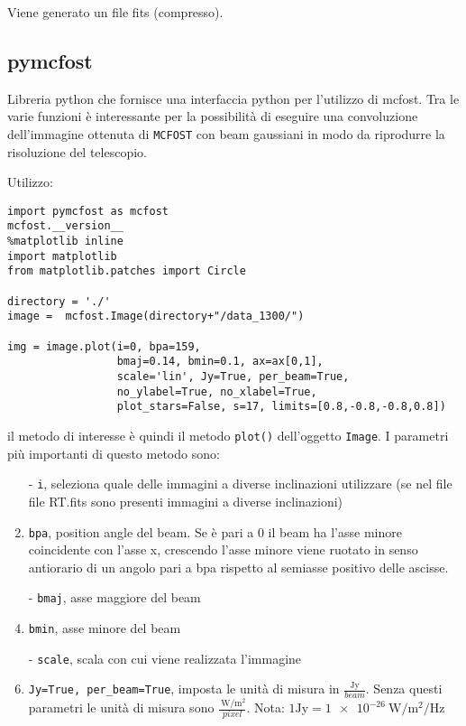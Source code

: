 \documentclass[DIN, pagenumber=false, fontsize=11pt, parskip=half]{scrartcl}
\begin{document}
Viene generato un file fits (compresso).

\subsection{pymcfost}
Libreria python che fornisce una interfaccia python per l'utilizzo di mcfost. Tra le varie funzioni è interessante per la possibilità di eseguire una convoluzione dell'immagine ottenuta di \lstinline{MCFOST} con beam gaussiani in modo da riprodurre la risoluzione del telescopio.

Utilizzo:
\begin{lstlisting}
import pymcfost as mcfost
mcfost.__version__
%matplotlib inline
import matplotlib 
from matplotlib.patches import Circle

directory = './'
image =  mcfost.Image(directory+"/data_1300/")

img = image.plot(i=0, bpa=159,
                 bmaj=0.14, bmin=0.1, ax=ax[0,1],
                 scale='lin', Jy=True, per_beam=True,
                 no_ylabel=True, no_xlabel=True,
                 plot_stars=False, s=17, limits=[0.8,-0.8,-0.8,0.8])
\end{lstlisting}

il metodo di interesse è quindi il metodo \lstinline{plot()} dell'oggetto \lstinline{Image}. I parametri più importanti di questo metodo sono:

\begin{enumerate}
 \item[-] \lstinline{i}, seleziona quale delle immagini a diverse inclinazioni utilizzare (se nel file file RT.fits sono presenti immagini a diverse inclinazioni)
 \item[-] \lstinline{bpa}, position angle del beam. Se è pari a 0 il beam ha l'asse minore coincidente con l'asse x, crescendo l'asse minore viene ruotato in senso antiorario di un angolo pari a bpa rispetto al semiasse positivo delle ascisse.
\item[-] \lstinline{bmaj}, asse maggiore del beam
\item[-] \lstinline{bmin}, asse minore del beam
\item[-] \lstinline{scale}, scala con cui viene realizzata l'immagine \item[-] \lstinline{Jy=True, per_beam=True}, imposta le unità di misura in $\frac {\text{Jy}}{beam}$. Senza questi parametri le unità di misura sono $\frac {\SI{}{\W\per\m\squared}}{pixel}$. Nota: $1\text{Jy} = \SI{1e-26}{\W\per\m\squared\per\Hz}$
\end{enumerate}
\end{document}
